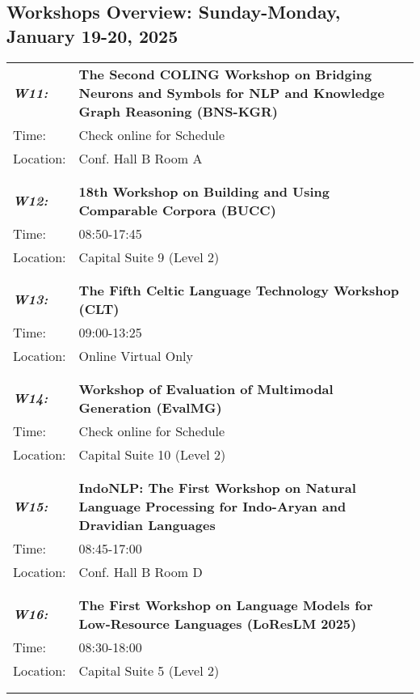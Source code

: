 \subsection{Workshops Overview: Sunday-Monday, January 19-20, 2025}
\begin{longtable}{p{15mm}p{100mm}}
\emph{\textbf{W11:}} & \textbf{The Second COLING Workshop on Bridging Neurons and Symbols for NLP and Knowledge Graph Reasoning (BNS-KGR)} \\
Time: & Check online for Schedule \\
Location: & Conf. Hall B Room A \\\\
\hline\\
\emph{\textbf{W12:}} & \textbf{18th Workshop on Building and Using Comparable Corpora (BUCC)} \\
Time: & 08:50-17:45 \\
Location: & Capital Suite 9 (Level 2) \\\\
\hline\\
\emph{\textbf{W13:}} & \textbf{The Fifth Celtic Language Technology Workshop (CLT)} \\
Time: & 09:00-13:25 \\
Location: & Online Virtual Only \\\\
\hline\\
\emph{\textbf{W14:}} & \textbf{Workshop of Evaluation of Multimodal Generation (EvalMG)} \\
Time: & Check online for Schedule \\
Location: & Capital Suite 10 (Level 2) \\\\
\hline\\
\emph{\textbf{W15:}} & \textbf{IndoNLP: The First Workshop on Natural Language Processing for Indo-Aryan and Dravidian Languages} \\
Time: & 08:45-17:00 \\
Location: & Conf. Hall B Room D \\\\
\hline\\
\emph{\textbf{W16:}} & \textbf{The First Workshop on Language Models for Low-Resource Languages (LoResLM 2025)} \\
Time: & 08:30-18:00 \\
Location: & Capital Suite 5 (Level 2) \\\\
\hline\\

\end{longtable}
